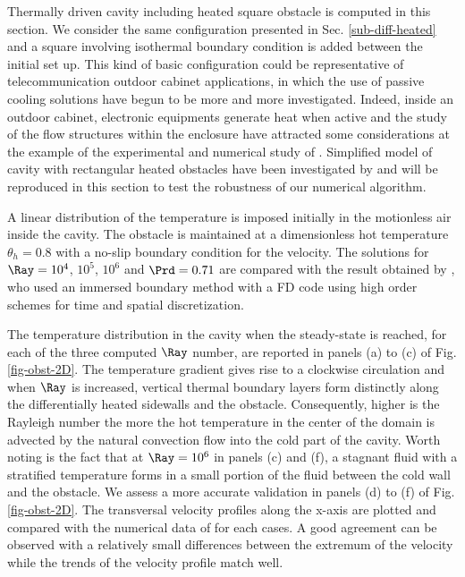 Thermally driven cavity including heated square obstacle is computed in this section.
We consider the same configuration presented in Sec. \ref{sub-diff-heated} and a square involving isothermal boundary condition is added between the initial set up.
This kind of basic configuration could be representative of telecommunication outdoor cabinet applications, in which the use of passive cooling solutions have begun to be more and more investigated.
Indeed, inside an outdoor cabinet, electronic equipments generate heat when active and the study of the flow structures within the enclosure have attracted some considerations at the example of the experimental and numerical study of \cite{Raluca2013}.
Simplified model of cavity with rectangular heated obstacles have been investigated by \cite{Raluca2013} and will be reproduced in this section to test the robustness of our numerical algorithm.

A linear distribution of the temperature is imposed initially in the motionless air inside the cavity.
The obstacle is maintained at a dimensionless hot temperature $\theta_h = 0.8$ with a no-slip boundary condition for the velocity.
The solutions for $\Ray= 10^4$, $10^5$, $10^6$ and $\Prd = 0.71$ are compared with the result obtained by \cite{Raluca2013}, who used an immersed boundary method with a FD code using high order schemes for time and spatial discretization.

The temperature distribution in the cavity when the steady-state is reached, for each of the three computed $\Ray$ number, are reported in panels (a) to (c) of Fig. \ref{fig-obst-2D}.
The temperature gradient gives rise to a clockwise circulation and when $\Ray$ is increased, vertical thermal boundary layers form distinctly along the differentially heated sidewalls and the obstacle.
Consequently, 
higher is the Rayleigh number the more the hot temperature in the center of the domain is advected by the natural convection flow into the cold part of the cavity. 
Worth noting is the fact that at $\Ray = 10^6$ in panels (c) and (f), a stagnant fluid with a stratified temperature forms in a small portion of the fluid between the cold wall and the obstacle.
We assess a more accurate validation in panels (d) to (f) of Fig. \ref{fig-obst-2D}.
The transversal velocity profiles along the x-axis are plotted and compared with the numerical data of \cite{Raluca2013} for each cases. 
A good agreement can be observed with a relatively small differences between the extremum of the velocity while the trends of the velocity profile match well.

